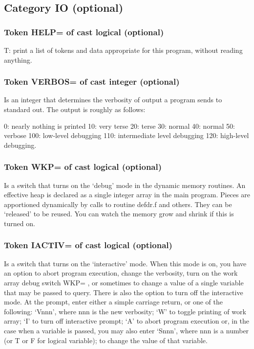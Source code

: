 \documentclass[aps,twocolumn,a4]{revtex4}
\begin{document}
\subsection{Category IO (optional)}

\subsubsection{Token HELP= of cast logical (optional)}
T: print a list of tokens and data appropriate for this program, without
reading anything.

\subsubsection{Token VERBOS= of cast integer (optional)}
Is an integer that determines the verbosity of output a program
sends to standard out.  The output is roughly as follows:

0: nearly nothing is printed 10: very terse 20: terse 30: normal 40:
normal 50: verbose 100: low-level debugging 110: intermediate level
debugging 120: high-level debugging.

\subsubsection{Token WKP= of cast logical (optional)}
Is a switch that turns on the `debug' mode in the dynamic
memory routines.  An effective heap is declared as a single integer
array in the main program.  Pieces are apportioned dynamically by calls
to routine defdr.f and others.  They can be `released' to be reused.
You can watch the memory grow and shrink if this is turned on.

\subsubsection{Token IACTIV= of cast logical (optional)}
Is a switch that turns on the `interactive' mode.  When
this mode is on, you have an option to abort program execution, change
the verbosity, turn on the work array debug switch WKP= , or sometimes
to change a value of a single variable that may be passed to query.
There is also the option to turn off the interactive mode.  At the
prompt, enter either a simple carriage return, or one of the following:
`Vnnn', where nnn is the new verbosity; `W' to toggle printing of work
array; `I' to turn off interactive prompt; `A' to abort program
execution or, in the case when a variable is passed, you may also enter
`Snnn', where nnn is a number (or T or F for logical variable); to
change the value of that variable.
\end{document}

